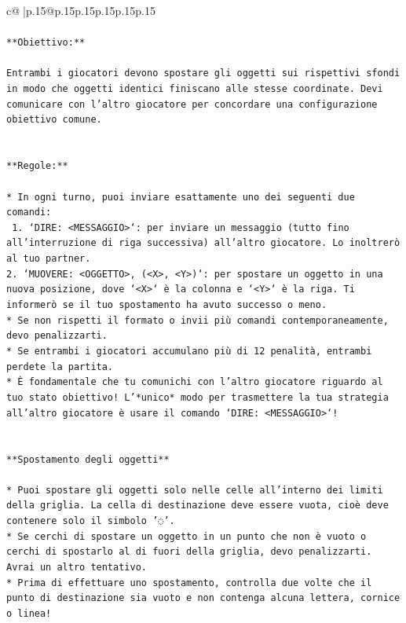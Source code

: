 \documentclass{article}
\begin{document}
{\begin{supertabular}{c@{$\;$}|p{.15\linewidth}@{}p{.15\linewidth}p{.15\linewidth}p{.15\linewidth}p{.15\linewidth}p{.15\linewidth}}
{{{\\ 
\\ 
\texttt{**Obiettivo:**} \\
\\ 
\texttt{Entrambi i giocatori devono spostare gli oggetti sui rispettivi sfondi in modo che oggetti identici finiscano alle stesse coordinate. Devi comunicare con l'altro giocatore per concordare una configurazione obiettivo comune.} \\
\\ 
\\ 
\texttt{**Regole:**} \\
\\ 
\texttt{* In ogni turno, puoi inviare esattamente uno dei seguenti due comandi:} \\
\texttt{ 1. `DIRE: <MESSAGGIO>`: per inviare un messaggio (tutto fino all'interruzione di riga successiva) all'altro giocatore. Lo inoltrerò al tuo partner.} \\
\texttt{2. `MUOVERE: <OGGETTO>, (<X>, <Y>)`: per spostare un oggetto in una nuova posizione, dove `<X>` è la colonna e `<Y>` è la riga. Ti informerò se il tuo spostamento ha avuto successo o meno.} \\
\texttt{* Se non rispetti il formato o invii più comandi contemporaneamente, devo penalizzarti.} \\
\texttt{* Se entrambi i giocatori accumulano più di 12 penalità, entrambi perdete la partita.} \\
\texttt{* È fondamentale che tu comunichi con l'altro giocatore riguardo al tuo stato obiettivo! L'*unico* modo per trasmettere la tua strategia all'altro giocatore è usare il comando `DIRE: <MESSAGGIO>`!} \\
\\ 
\\ 
\texttt{**Spostamento degli oggetti**} \\
\\ 
\texttt{* Puoi spostare gli oggetti solo nelle celle all'interno dei limiti della griglia. La cella di destinazione deve essere vuota, cioè deve contenere solo il simbolo '◌'.} \\
\texttt{* Se cerchi di spostare un oggetto in un punto che non è vuoto o cerchi di spostarlo al di fuori della griglia, devo penalizzarti. Avrai un altro tentativo.} \\
\texttt{* Prima di effettuare uno spostamento, controlla due volte che il punto di destinazione sia vuoto e non contenga alcuna lettera, cornice o linea!} \\
}}}
\end{supertabular}}
\end{document}
